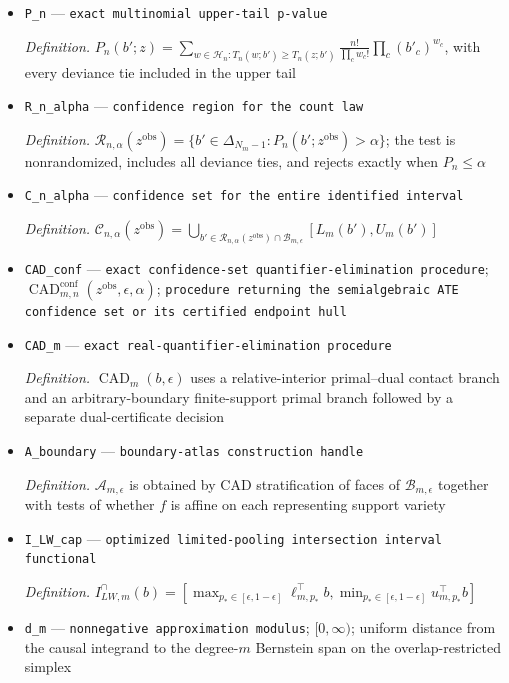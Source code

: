 \documentclass{article}
\begin{document}
\begin{itemize}
  \par\smallskip\noindent\emph{Definition.} \(T_n(z;b')=2\sum_{c:z_c>0}z_c\log\{z_c/(nb'_c)\}\), where a zero-count summand is \(0\) and \(T_n(z;b')=+\infty\) if \(z_c>0=b'_c\) for some \(c\)
  \item \texttt{P\_\allowbreak{}n} --- \texttt{exact multinomial upper-\allowbreak{}tail p-\allowbreak{}value}
  \par\smallskip\noindent\emph{Definition.} \(P_n(b';z)=\sum_{w\in\mathcal H_n:T_n(w;b')\ge T_n(z;b')}\frac{n!}{\prod_cw_c!}\prod_c(b'_c)^{w_c}\), with every deviance tie included in the upper tail
  \item \texttt{R\_\allowbreak{}n\_\allowbreak{}alpha} --- \texttt{confidence region for the count law}
  \par\smallskip\noindent\emph{Definition.} \(\mathcal R_{n,\alpha}(z^{\mathrm{obs}})=\{b'\in\Delta_{N_m-1}:P_n(b';z^{\mathrm{obs}})>\alpha\}\); the test is nonrandomized, includes all deviance ties, and rejects exactly when \(P_n\le\alpha\)
  \item \texttt{C\_\allowbreak{}n\_\allowbreak{}alpha} --- \texttt{confidence set for the entire identified interval}
  \par\smallskip\noindent\emph{Definition.} \(\mathcal C_{n,\alpha}(z^{\mathrm{obs}})=\bigcup_{b'\in\mathcal R_{n,\alpha}(z^{\mathrm{obs}})\cap\mathcal B_{m,\epsilon}}[L_m(b'),U_m(b')]\)
  \item \texttt{CAD\_\allowbreak{}conf} --- \texttt{exact confidence-\allowbreak{}set quantifier-\allowbreak{}elimination procedure}; \(\operatorname{CAD}^{\mathrm{conf}}_{m,n}(z^{\mathrm{obs}},\epsilon,\alpha)\); \texttt{procedure returning the semialgebraic ATE confidence set or its certified endpoint hull}
  \item \texttt{CAD\_\allowbreak{}m} --- \texttt{exact real-\allowbreak{}quantifier-\allowbreak{}elimination procedure}
  \par\smallskip\noindent\emph{Definition.} \(\operatorname{CAD}_m(b,\epsilon)\) uses a relative-interior primal--dual contact branch and an arbitrary-boundary finite-support primal branch followed by a separate dual-certificate decision
  \item \texttt{A\_\allowbreak{}boundary} --- \texttt{boundary-\allowbreak{}atlas construction handle}
  \par\smallskip\noindent\emph{Definition.} \(\mathcal A_{m,\epsilon}\) is obtained by CAD stratification of faces of \(\mathcal B_{m,\epsilon}\) together with tests of whether \(f\) is affine on each representing support variety
  \item \texttt{I\_\allowbreak{}LW\_\allowbreak{}cap} --- \texttt{optimized limited-\allowbreak{}pooling intersection interval functional}
  \par\smallskip\noindent\emph{Definition.} \(I_{LW,m}^{\cap}(b)=[\max_{p_*\in[\epsilon,1-\epsilon]}\ell_{m,p_*}^{\top}b,\min_{p_*\in[\epsilon,1-\epsilon]}u_{m,p_*}^{\top}b]\)
  \item \texttt{d\_\allowbreak{}m} --- \texttt{nonnegative approximation modulus}; \([0,\infty)\); uniform distance from the causal integrand to the degree-\(m\) Bernstein span on the overlap-restricted simplex
\end{itemize}
\end{document}
